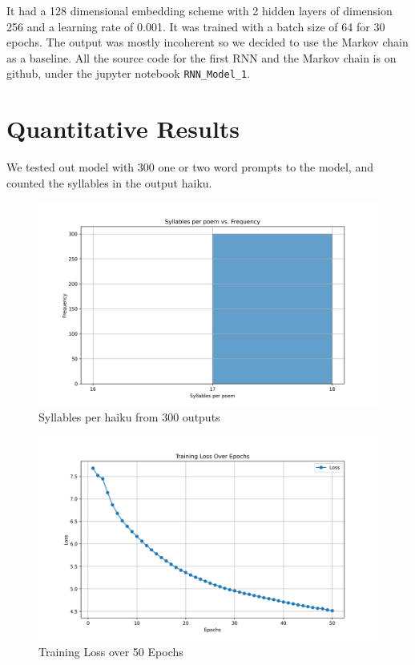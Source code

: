 \documentclass{article} %
\begin{document}
It had a 128 dimensional embedding scheme with 2 hidden layers of dimension 256 and a learning rate of 0.001. It was trained with a batch size of 64
for 30 epochs. The output was mostly incoherent so we decided to use the Markov chain as a baseline. All the source code for the first RNN and the
Markov chain is on github, under the jupyter notebook \texttt{RNN\_Model\_1}.


\section{Quantitative Results}

We tested out model with 300 one or two word prompts to the model, and counted the syllables in the output haiku.

\begin{figure}[h]
  \begin{center}
  \includegraphics[width=1\textwidth]{Figs/syllable_count_last_word-1.png}
  \end{center}
  \caption{Syllables per haiku from 300 outputs}
  \label{fig:plot1}
\end{figure}

\begin{figure}[h]
  \begin{center}
  \includegraphics[width=1\textwidth]{Figs/loss-vs-epochs-2.png}
  \end{center}
  \caption{Training Loss over 50 Epochs}
  \label{fig:lossvepochs}
\end{figure}
\end{document}

